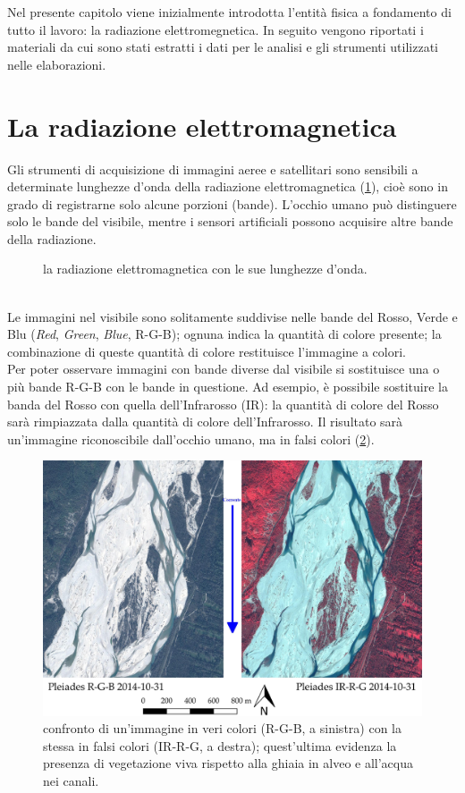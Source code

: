 Nel presente capitolo viene inizialmente introdotta l'entità fisica a fondamento di tutto il lavoro: la radiazione elettromegnetica.
In seguito vengono riportati i materiali da cui sono stati estratti i dati per le analisi e gli strumenti utilizzati nelle elaborazioni.


\section{La radiazione elettromagnetica}
Gli strumenti di acquisizione di immagini aeree e satellitari sono sensibili a determinate lunghezze d'onda della radiazione elettromagnetica (\cref{graph:el-mag-radiation}), cioè sono in grado di registrarne solo alcune porzioni (bande).
L'occhio umano può distinguere solo le bande del visibile, mentre i sensori artificiali possono acquisire altre bande della radiazione.
%
\begin{figure}
	\centering
	
	\caption[la radiazione elettromagnetica]{la radiazione elettromagnetica con le sue lunghezze d'onda.}
	\label{graph:el-mag-radiation}
\end{figure}
%
\\
Le immagini nel visibile sono solitamente suddivise nelle bande del Rosso, Verde e Blu (\emph{Red}, \emph{Green}, \emph{Blue}, R-G-B); ognuna indica la quantità di colore presente; la combinazione di queste quantità di colore restituisce l'immagine a colori.
\\
Per poter osservare immagini con bande diverse dal visibile si sostituisce una o più bande R-G-B con le bande in questione.
Ad esempio, è possibile sostituire la banda del Rosso con quella dell'Infrarosso (IR): la quantità di colore del Rosso sarà rimpiazzata dalla quantità di colore dell'Infrarosso.
Il risultato sarà un'immagine riconoscibile dall'occhio umano, ma in falsi colori (\cref{fig:confronto-bande-intro}).
%
\begin{figure}
	\centering
	\includegraphics[width=\textwidth]{files/confronto_bande_intro.jpeg}
	\caption[confronto immagini R-G-B e IR-R-G]{confronto di un'immagine in veri colori (R-G-B, a sinistra) con la stessa in falsi colori (IR-R-G, a destra); quest'ultima evidenza la presenza di vegetazione viva rispetto alla ghiaia in alveo e all'acqua nei canali.}
	\label{fig:confronto-bande-intro}
\end{figure}
